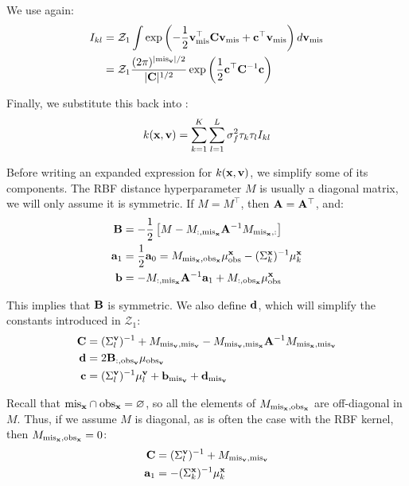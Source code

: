 \documentclass[letterpaper]{article}
\newcommand{\tp}{\top}
\newcommand{\vx}{{\bf x}}
\newcommand{\vv}{{\bf v}}
\newcommand{\va}{{\bf a}}
\newcommand{\vA}{{\bf A}}
\newcommand{\vb}{{\bf b}}
\newcommand{\vB}{{\bf B}}
\newcommand{\vc}{{\bf c}}
\newcommand{\vd}{{\bf d}}
\newcommand{\vC}{{\bf C}}
\newcommand{\mis}{\text{mis}}
\newcommand{\obs}{\text{obs}}
\newcommand{\misx}{{\text{mis}_\vx}}
\newcommand{\obsx}{{\text{obs}_\vx}}
\newcommand{\misv}{{\text{mis}_\vv}}
\newcommand{\obsv}{{\text{obs}_\vv}}
\begin{document}
We use  again:
\begin{equation*}
\begin{aligned}
I_{kl} &= \mathcal{Z}_1 \int \exp \left(-\frac{1}{2}\vv_\mis^\tp \vC \vv_\mis + \vc^\tp
\vv_\mis \right) d\vv_\mis \\
 &= \mathcal{Z}_1 \frac{(2\pi)^{|\misv|/2}}{|\vC|^{1/2}}\exp\left(\frac{1}{2}\vc^\tp \vC^{-1}\vc\right)
\end{aligned}
\end{equation*}

Finally, we substitute this back into :
\begin{equation}
k(\vx, \vv) = \sum_{k=1}^K\sum_{l=1}^L \sigma_f^2 \tau_k\tau_l I_{kl}
\end{equation}

Before writing an expanded expression for $k(\vx, \vv)$, we simplify some of
its components. The \ac{RBF} distance hyperparameter $M$ is usually a diagonal
matrix, we will only assume it is symmetric. If $M = M^\tp$, then $\vA =
\vA^\tp$, and:
\begin{equation*}
\begin{aligned}
  \vB &= -\frac{1}{2}\left[M - M_{:,\misx}\vA^{-1}M_{\misx,:}\right] \\
  \va_1 &= \frac{1}{2}\va_0 = M_{\misx,\obsx} \mu_\obs^\vx - (\Sigma_k^\vx)^{-1}\mu_k^\vx \\
  \vb &= - M_{:,\misx}\vA^{-1} \va_1 + M_{:,\obsx}\mu^\vx_\obs
\end{aligned}
\end{equation*}

This implies that $\vB$ is symmetric. We also define $\vd$, which will simplify
the constants introduced in $\mathcal{Z}_1$:
\begin{equation*}
\begin{aligned}
  \vC &= (\Sigma_l^\vv)^{-1} + M_{\misv,\misv} - M_{\misv,\misx}\vA^{-1}M_{\misx,\misv} \\
  \vd &= 2\vB_{:,\obsv}\mu_\obsv \\
  \vc &= (\Sigma_l^\vv)^{-1}\mu_l^\vv + \vb_\misv + \vd_\misv
\end{aligned}
\end{equation*}

Recall that $\misx \cap \obsx = \varnothing$, so all the elements of
$M_{\misx,\obsx}$ are off-diagonal in $M$. Thus, if we assume $M$ is diagonal,
as is often the case with the \ac{RBF} kernel, then $M_{\misx,\obsx} = 0$:
\begin{equation*}
\begin{aligned}
  \vC &= (\Sigma_l^\vv)^{-1} + M_{\misv,\misv}\\
  \va_1 &= - (\Sigma_k^\vx)^{-1}\mu_k^\vx \\
\end{aligned}
\end{equation*}
\end{document}

